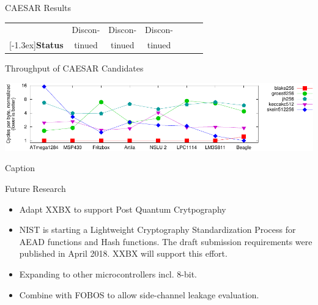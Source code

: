 \documentclass[xcolor=pdftex,dvipsnames,table,final]{beamer}
\newcommand{\rb}[1]{\raisebox{1.3ex}[-1.3ex]{#1}}
\begin{document}
\begin{frame}[fragile]{}
\begin{columns}[t, totalwidth=\textwidth]
\begin{column}{.675\linewidth}
\begin{columns}
\begin{column}{.473\linewidth}
\begin{block}{CAESAR Results}
\begin{center}
{\begin{tabular}{|r||c|c|c|c||c|c}
                                  &Discon-   &Discon-     &Discon-        &              &              &               \\ 
            \rowcolor{RoyalBlue!5}%
            \rb{\textbf{Status}}  &tinued    &tinued      &tinued         &              &              &               \\ \hline
          \end{tabular}
        }
        \end{center}
       \end{block}
       \begin{block}{Throughput of CAESAR Candidates}
        \vspace{-1ex}
         \begin{center}
           \includegraphics[width=0.9\linewidth]{../figures/cycles_per_byte}

           {\small Caption}
         \end{center}
       \end{block}

       \begin{block}{Future Research}
        \begin{itemize}
          \item Adapt XXBX to support Post Quantum Crytpography
          \item NIST is starting a Lightweight Cryptography Standardization Process for
                AEAD functions and Hash functions. The draft submission requirements 
                were published in April 2018. XXBX will support this effort.
          \item Expanding to other microcontrollers incl. 8-bit.
          \item Combine with FOBOS to allow side-channel leakage evaluation.
        \end{itemize}
       \end{block}

%          
%          
   \end{column}
   \end{columns}


\end{column}
\end{columns}
\end{frame}
\end{document}
